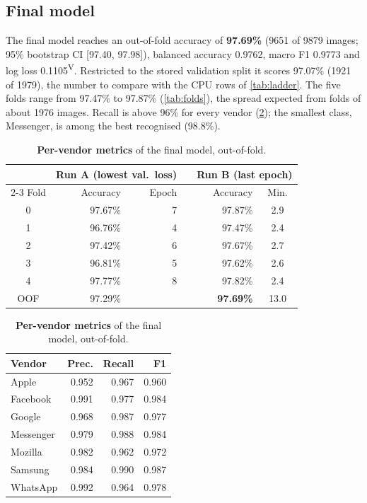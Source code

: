 \documentclass[11pt,a4paper]{article}
\newcommand{\ver}{\textsuperscript{\textcolor{verified}{\sffamily\scriptsize V}}}
\newcommand{\pct}[1]{#1\%}
\begin{document}
\subsection{Final model}
\label{sec:final}
The final model reaches an out-of-fold accuracy of \textbf{\pct{97.69}} (\num{9651} of \num{9879} images; 95\% bootstrap CI [97.40, 97.98]), balanced accuracy 0.9762, macro F1 0.9773 and log loss 0.1105\ver. Restricted to the stored validation split it scores \pct{97.07} (\num{1921} of \num{1979}), the number to compare with the CPU rows of \cref{tab:ladder}. The five folds range from \pct{97.47} to \pct{97.87} (\cref{tab:folds}), the spread expected from folds of about \num{1976} images. Recall is above \pct{96} for every vendor (\cref{tab:perclass}); the smallest class, Messenger, is among the best recognised (\pct{98.8}).

\begin{table}[t]
\centering\small
\begin{minipage}[t]{0.56\textwidth}\vspace{0pt}
\caption{\textbf{Per-fold results} (flip TTA). Both runs share every training batch; only the epoch kept differs.}
\label{tab:folds}
\begin{tabular}{@{}crrcrc@{}}
\toprule
 & \multicolumn{2}{c}{Run A (lowest val.\ loss)} & & \multicolumn{2}{c}{Run B (last epoch)}\\
\cmidrule{2-3}\cmidrule{5-6}
Fold & Accuracy & Epoch & & Accuracy & Min.\\
\midrule
0 & 97.67\% & 7 & & 97.87\% & 2.9\\
1 & 96.76\% & 4 & & 97.47\% & 2.4\\
2 & 97.42\% & 6 & & 97.67\% & 2.7\\
3 & 96.81\% & 5 & & 97.62\% & 2.6\\
4 & 97.77\% & 8 & & 97.82\% & 2.4\\
\midrule
OOF & 97.29\% & & & \textbf{97.69\%} & 13.0\\
\bottomrule
\end{tabular}
\end{minipage}\hfill
\begin{minipage}[t]{0.4\textwidth}\vspace{0pt}
\caption{\textbf{Per-vendor metrics} of the final model, out-of-fold.}
\label{tab:perclass}
\begin{tabular}{@{}lrrr@{}}
\toprule
Vendor & Prec. & Recall & F1\\
\midrule
Apple     & 0.952 & 0.967 & 0.960\\
Facebook  & 0.991 & 0.977 & 0.984\\
Google    & 0.968 & 0.987 & 0.977\\
Messenger & 0.979 & 0.988 & 0.984\\
Mozilla   & 0.982 & 0.962 & 0.972\\
Samsung   & 0.984 & 0.990 & 0.987\\
WhatsApp  & 0.992 & 0.964 & 0.978\\
\bottomrule
\end{tabular}
\end{minipage}
\end{table}
\end{document}
